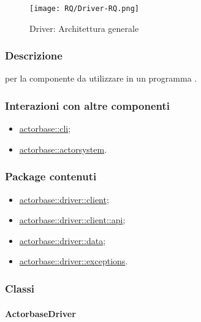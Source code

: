 \documentclass{scalatekids-article}
\begin{document}
\begin{figure}[H]
  \begin{center}
    \texttt{[image: RQ/Driver-RQ.png]}
    \caption{Driver: Architettura generale}
  \end{center}
\end{figure}

\subsubsection{Descrizione}

 per la componente  da utilizzare in un programma
.

\subsubsection{Interazioni con altre componenti}

\begin{itemize}
\item \hyperref[sec:actorbase::cli]{actorbase::cli};
\item \hyperref[sec:actorbase::actorsystem]{actorbase::actorsystem}.
\end{itemize}

\subsubsection{Package contenuti}

\begin{itemize}
\item \hyperref[sec:actorbase::driver::client]{actorbase::driver::client};
\item \hyperref[sec:actorbase::driver::client::api]{actorbase::driver::client::api};
\item \hyperref[sec:actorbase::driver::data]{actorbase::driver::data};
\item \hyperref[sec:actorbase::driver::exceptions]{actorbase::driver::exceptions}.
\end{itemize}

\subsubsection{Classi}

\paragraph{ActorbaseDriver}
\label{sec:actorbase::driver::ActorbaseDriver}
\end{document}
